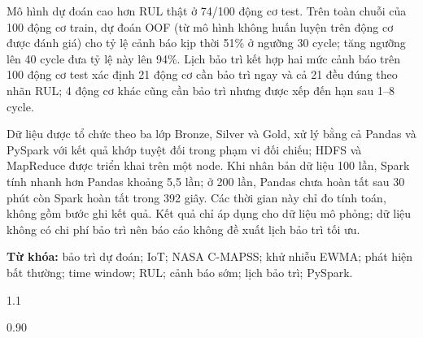 \documentclass[11pt,a4paper]{article}
\begin{document}
Mô hình dự đoán cao hơn RUL thật ở 74/100 động cơ test. Trên toàn chuỗi của 100
động cơ train, dự đoán OOF (từ mô hình không huấn luyện trên động cơ được đánh giá)
cho tỷ lệ cảnh báo kịp thời 51\% ở ngưỡng 30 cycle; tăng ngưỡng lên 40 cycle đưa
tỷ lệ này lên 94\%. Lịch bảo trì kết hợp hai mức cảnh báo trên 100 động cơ test
xác định 21 động cơ cần bảo trì ngay và cả 21 đều đúng theo nhãn RUL; 4 động cơ
khác cũng cần bảo trì nhưng được xếp đến hạn sau 1--8 cycle.

Dữ liệu được tổ chức theo ba lớp Bronze, Silver và Gold, xử lý bằng cả Pandas và
PySpark với kết quả khớp tuyệt đối trong phạm vi đối chiếu; HDFS và MapReduce được
triển khai trên một node. Khi nhân bản dữ liệu 100 lần, Spark tính nhanh hơn Pandas
khoảng 5,5 lần; ở 200 lần, Pandas chưa hoàn tất sau 30 phút còn Spark hoàn tất trong
392 giây. Các thời gian này chỉ đo tính toán, không gồm bước ghi kết quả.
Kết quả chỉ áp dụng cho dữ liệu mô phỏng; dữ liệu không có chi phí bảo trì nên báo cáo
không đề xuất lịch bảo trì tối ưu.

\noindent\textbf{Từ khóa:} bảo trì dự đoán; IoT; NASA C-MAPSS; khử nhiễu EWMA;
phát hiện bất thường; time window; RUL; cảnh báo sớm; lịch bảo trì; PySpark.
\clearpage
\begin{spacing}{1.1}
\setcounter{tocdepth}{1}
\tableofcontents
\end{spacing}
\clearpage

\listoffigures
\clearpage
\listoftables
\clearpage
{}

\clearpage

\clearpage

\clearpage

\clearpage

\clearpage

\clearpage

\clearpage
{}
{}

\begin{spacing}{0.90}
\scriptsize

\end{spacing}
\end{document}

